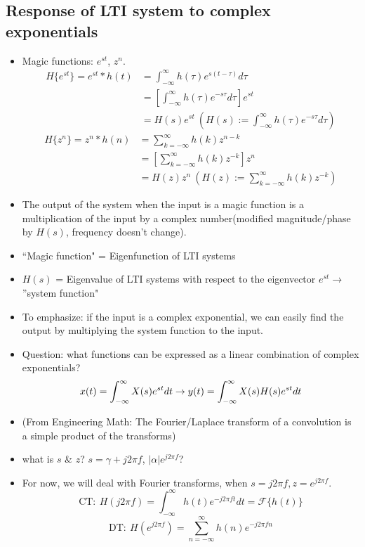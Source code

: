 \documentclass{article}
\begin{document}
\subsection{Response of LTI system to complex exponentials}
\begin{itemize}
\item Magic functions: $e^{st}$, $z^n$.
\begin{align*}
H\{e^{st}\}=e^{st}*h(t)&=\int_{-\infty}^{\infty}{h(\tau)e^{s(t-\tau)}d\tau}\\
&=\left[\int_{-\infty}^{\infty}{h(\tau)e^{-s\tau}d\tau}\right]e^{st}\\
&=H(s)e^{st}\:(H(s):=\int_{-\infty}^{\infty}{h(\tau)e^{-s\tau}d\tau})
\end{align*}
\begin{align*}
H\{z^n\}=z^n*h(n)&=\sum_{k=-\infty}^{\infty}{h(k)z^{n-k}}\\
&=\left[\sum_{k=-\infty}^{\infty}{h(k)z^{-k}}\right]z^n\\
&=H(z)z^n\:(H(z):=\sum_{k=-\infty}^{\infty}{h(k)z^{-k}})
\end{align*}
\item The output of the system when the input is a magic function is a multiplication of the input by a complex number(modified magnitude/phase by $H(s)$, frequency doesn't change).
\item ``Magic function" = Eigenfunction of LTI systems
\item $H(s)$ = Eigenvalue of LTI systems with respect to the eigenvector $e^{st}$$\rightarrow$ ''system function"
\item To emphasize: if the input is a complex exponential, we can easily find the output by multiplying the system function to the input.
\item Question: what functions can be expressed as a linear combination of complex exponentials?
\[
x(t)=\int_{-\infty}^{\infty}{X(s)e^{st}dt}\rightarrow\\
y(t)=\int_{-\infty}^{\infty}{X(s)H(s)e^{st}dt}
\]
\item (From Engineering Math: The Fourier/Laplace transform of a convolution is a simple product of the transforms)
\item what is $s$ \& $z$? $s=\gamma+j2\pi f$,  $|\alpha|e^{j2\pi f}$?
\item For now, we will deal with Fourier transforms, when $s=j2\pi f, z=e^{j2\pi f}$.
\[\mathrm{CT:}\:H(j2\pi f)= \int_{-\infty}^{\infty}{h(t)e^{-j2\pi ft}dt}=\mathcal{F}\{h(t)\}\]
\[\mathrm{DT:}\:H(e^{j2\pi f})=\sum_{n=-\infty}^{\infty}{h(n)e^{-j2\pi fn}}\]
$$
\end{itemize}
\end{document}

